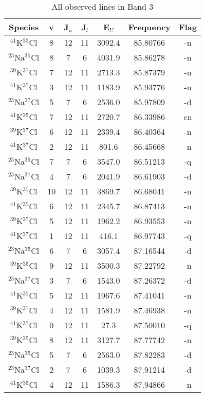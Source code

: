 \begin{table*}[htp]
\centering
\caption{All observed lines in Band 3}
\begin{tabular}{ccccccc}
\label{tab:all_detections_B3}
Species & v & J$_u$ & J$_l$ & E$_U$ & Frequency & Flag \\
\hline
$^{41}$K$^{35}$Cl & 8 & 12 & 11 & 3092.4 & 85.80766 & -n \\
$^{23}$Na$^{35}$Cl & 8 & 7 & 6 & 4031.9 & 85.86278 & -n \\
$^{39}$K$^{37}$Cl & 7 & 12 & 11 & 2713.3 & 85.87379 & -n \\
$^{41}$K$^{37}$Cl & 3 & 12 & 11 & 1183.9 & 85.93776 & -n \\
$^{23}$Na$^{37}$Cl & 5 & 7 & 6 & 2536.0 & 85.97809 & -d \\
$^{41}$K$^{35}$Cl & 7 & 12 & 11 & 2720.7 & 86.33986 & cn \\
$^{39}$K$^{37}$Cl & 6 & 12 & 11 & 2339.4 & 86.40364 & -n \\
$^{41}$K$^{37}$Cl & 2 & 12 & 11 & 801.6 & 86.45668 & -n \\
$^{23}$Na$^{35}$Cl & 7 & 7 & 6 & 3547.0 & 86.51213 & -q \\
$^{23}$Na$^{37}$Cl & 4 & 7 & 6 & 2041.9 & 86.61903 & -d \\
$^{39}$K$^{35}$Cl & 10 & 12 & 11 & 3869.7 & 86.68041 & -n \\
$^{41}$K$^{35}$Cl & 6 & 12 & 11 & 2345.7 & 86.87413 & -n \\
$^{39}$K$^{37}$Cl & 5 & 12 & 11 & 1962.2 & 86.93553 & -n \\
$^{41}$K$^{37}$Cl & 1 & 12 & 11 & 416.1 & 86.97743 & -q \\
$^{23}$Na$^{35}$Cl & 6 & 7 & 6 & 3057.4 & 87.16544 & -d \\
$^{39}$K$^{35}$Cl & 9 & 12 & 11 & 3500.3 & 87.22792 & -n \\
$^{23}$Na$^{37}$Cl & 3 & 7 & 6 & 1543.0 & 87.26372 & -d \\
$^{41}$K$^{35}$Cl & 5 & 12 & 11 & 1967.6 & 87.41041 & -n \\
$^{39}$K$^{37}$Cl & 4 & 12 & 11 & 1581.9 & 87.46938 & -n \\
$^{41}$K$^{37}$Cl & 0 & 12 & 11 & 27.3 & 87.50010 & -q \\
$^{39}$K$^{35}$Cl & 8 & 12 & 11 & 3127.7 & 87.77742 & -n \\
$^{23}$Na$^{35}$Cl & 5 & 7 & 6 & 2563.0 & 87.82283 & -d \\
$^{23}$Na$^{37}$Cl & 2 & 7 & 6 & 1039.3 & 87.91214 & -d \\
$^{41}$K$^{35}$Cl & 4 & 12 & 11 & 1586.3 & 87.94866 & -n \\

\end{tabular}
\end{table*}
